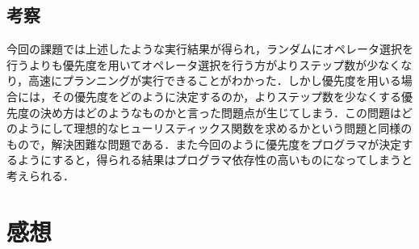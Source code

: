 \documentclass[a4j]{jarticle}
\begin{document}
\subsection{考察}
今回の課題では上述したような実行結果が得られ，ランダムにオペレータ選択を行うよりも優先度を用いてオペレータ選択を行う方がよりステップ数が少なくなり，高速にプランニングが実行できることがわかった．しかし優先度を用いる場合には，その優先度をどのように決定するのか，よりステップ数を少なくする優先度の決め方はどのようなものかと言った問題点が生じてしまう．この問題はどのようにして理想的なヒューリスティックス関数を求めるかという問題と同様のもので，解決困難な問題である．また今回のように優先度をプログラマが決定するようにすると，得られる結果はプログラマ依存性の高いものになってしまうと考えられる．

\section{感想}
\end{document}
